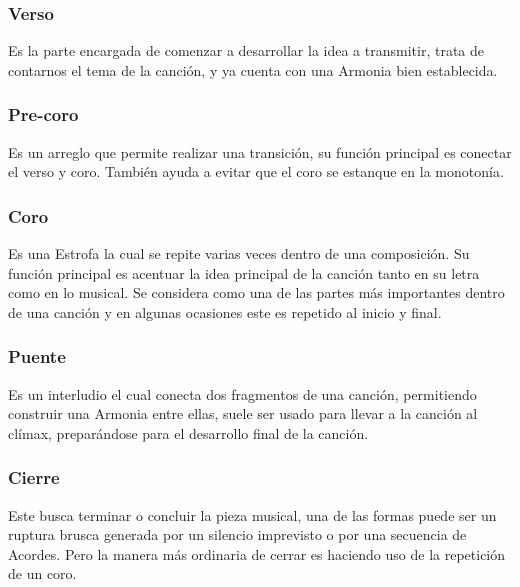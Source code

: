 \documentclass[12pt, a4paper, titlepage]{report}
\begin{document}
				\subsubsection*{Verso}\par
				Es la parte encargada de comenzar a desarrollar la idea a transmitir, trata de contarnos el tema de la canción, y ya cuenta con una \gls{Armonia} bien establecida.\par
				\subsubsection*{Pre-coro}\par
				Es un arreglo que permite realizar una transición, su función principal es conectar el verso y coro. También ayuda a evitar que el coro se estanque en la monotonía.\par
				\subsubsection*{Coro}\par
				Es una \gls{Estrofa} la cual se repite varias veces dentro de una composición. Su función principal es acentuar la idea principal de la canción tanto en su letra como en lo musical. Se considera como una de las partes más importantes dentro de una canción y en algunas ocasiones este es repetido al inicio y final.\par
				\subsubsection*{Puente}\par
				Es un interludio el cual conecta dos fragmentos de una canción, permitiendo construir una \gls{Armonia} entre ellas, suele ser usado para llevar a la canción al clímax, preparándose para el desarrollo final de la canción.\par
				\subsubsection*{Cierre}\par
				Este busca terminar o concluir la pieza musical, una de las formas puede ser un ruptura brusca generada por un silencio imprevisto o por una secuencia de \gls{Acordes}. Pero la manera más ordinaria de cerrar es haciendo uso de la repetición de un coro.\par

			
\end{document}
